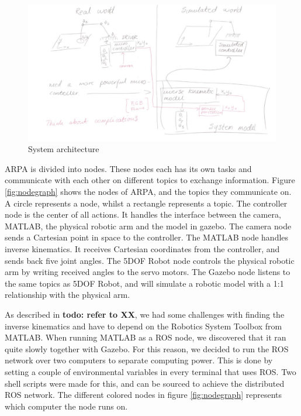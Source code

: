 \documentclass[11pt,a4paper, titlepage]{article}
\begin{document}
	\begin{figure}[H]
		\includegraphics[width=\linewidth]{../Diagrams/Architecture.png}
		\caption{System architecture}
		\label{fig:architecture}
	\end{figure}
	
	ARPA is divided into nodes. These nodes each has its own tasks and communicate with each other on different topics to exchange information. Figure \ref{fig:nodegraph} shows the nodes of ARPA, and the topics they communicate on. A circle represents a node, whilst a rectangle represents a topic. The controller node is the center of all actions. It handles the interface between the camera, MATLAB, the physical robotic arm and the model in gazebo. The camera node  sends a Cartesian point in space to the controller. The MATLAB node handles inverse kinematics. It receives Cartesian coordinates from the controller, and sends back five joint angles. The 5DOF Robot node controls the physical robotic arm by writing received angles to the servo motors. The Gazebo node listens to the same topics as 5DOF Robot, and will simulate a robotic model with a 1:1 relationship with the physical arm.
	
As described in \textbf{todo: refer to XX}, we had some challenges with finding the inverse kinematics and have to depend on the Robotics System Toolbox from MATLAB. When running MATLAB as a ROS node, we discovered that it ran quite slowly together with Gazebo. For this reason, we decided to run the ROS network over two computers to separate computing power. This is done by setting a couple of environmental variables in every terminal that uses ROS. Two shell scripts were made for this, and can be sourced to achieve the distributed ROS network. The different colored nodes in figure \ref{fig:nodegraph} represents which computer the node runs on.
\end{document}
